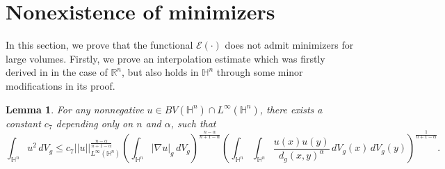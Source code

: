 \documentclass[11pt,reqno]{amsart}
\newtheorem{lem}[thm]{Lemma}
\theoremstyle{definition}
\theoremstyle{remark}
\numberwithin{equation}{section}
\renewcommand{\(}{\left(}
\renewcommand{\)}{\right)}
\renewcommand{\-}{\overline}
\begin{document}
\section{Nonexistence of minimizers}\label{Sec-Nonex}
In this section, we prove that the functional $\mathcal{E}(\cdot)$ does not admit minimizers for large volumes. Firstly, we prove an  interpolation estimate which was firstly derived in \cite[Lemma 7.1]{Knupfer-Muratov14} in the case of $\mathbb{R}^n$, but also holds in $\mathbb{H}^n$ through some minor modifications in its proof.
\begin{lem}\label{Lem-Inter}
	For any nonnegative $u\in BV(\mathbb{H}^n)\cap L^{\infty}(\mathbb{H}^n)$, there exists a constant $c_7$ depending only on $n$ and $\alpha$, such that 
	\begin{equation}\label{Lem-Inter1}
		\int_{\mathbb{H}^n}{u^2}\,dV_g\leq c_7||u||^{\frac{n-\alpha}{n+1-\alpha}}_{L^{\infty}(\mathbb{H}^n)}\left(\int_{\mathbb{H}^n}{|\nabla u|_g}\,dV_g\right)^{\frac{n-\alpha}{n+1-\alpha}}\left(\int_{\mathbb{H}^n}\int_{\mathbb{H}^n}\frac{u(x)u(y)}{d_g(x,y)^{\alpha}}\,dV_g(x)\,dV_g(y)\right)^{\frac{1}{n+1-\alpha}}.
	\end{equation}
\end{lem}
\end{document}
